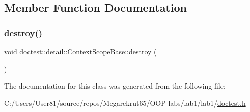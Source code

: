 \subsection{Member Function Documentation}
\mbox{\label{classdoctest_1_1detail_1_1_context_scope_base_a6f223de9a972b08bf1b9e9d2d99ab4c6}} 
\subsubsection{\texorpdfstring{destroy()}{destroy()}}
{\footnotesize\ttfamily void doctest\+::detail\+::\+Context\+Scope\+Base\+::destroy (\begin{DoxyParamCaption}{ }\end{DoxyParamCaption})\hspace{0.3cm}{\ttfamily [protected]}}



The documentation for this class was generated from the following file\+:\begin{DoxyCompactItemize}
\item 
C\+:/\+Users/\+User81/source/repos/\+Megarekrut65/\+O\+O\+P-\/labs/lab1/lab1/\mbox{\hyperlink{doctest_8h}{doctest.\+h}}\end{DoxyCompactItemize}
